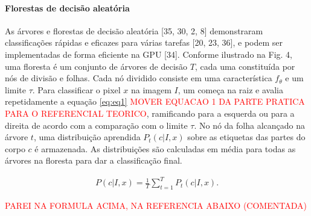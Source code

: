 \paragraph{Florestas de decisão aleatória }\label{sec:forests}
As árvores e florestas de decisão aleatória [35, 30, 2, 8] demonstraram classificações rápidas e eficazes para várias tarefas [20, 23, 36], e podem ser implementadas de forma eficiente na GPU [34]. Conforme ilustrado na Fig. 4, uma floresta é um conjunto de árvores de decisão $T$, cada uma constituída por nós de divisão e folhas. Cada nó dividido consiste em uma característica ${f_{\theta}}$ e um limite $\tau$. Para classificar o pixel $x$ na imagem $I$, um começa na raiz e avalia repetidamente a equação \ref{eq:eq1} \textcolor{red}{MOVER EQUACAO 1 DA PARTE PRATICA PARA O REFERENCIAL TEORICO}, ramificando para a esquerda ou para a direita de acordo com a comparação com o limite $\tau$. No nó da folha alcançado na árvore $t$, uma distribuição aprendida $P_{t} (c | I, x)$ sobre as etiquetas das partes do corpo $c$ é armazenada. As distribuições são calculadas em média para todas as árvores na floresta para dar a classificação final.

\begin{align}
P(c | I, x) = \frac{1}{T} \sum_{t=1}^{T} P_{t} (c | I, x).
\label{eq:eq2}
\end{align}

\textcolor{red}{PAREI NA FORMULA ACIMA, NA REFERENCIA ABAIXO (COMENTADA)}
